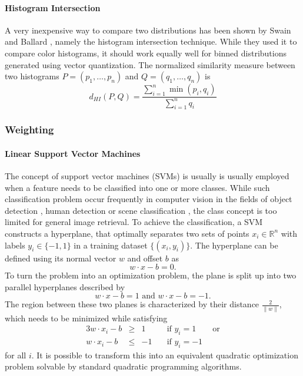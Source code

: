 \paragraph{Histogram Intersection}

A very inexpensive way to compare two distributions has been shown by Swain and
Ballard \autocite{swain_color_1991}, namely the histogram intersection
technique. While they used it to compare color histograms, it should work
equally well for binned distributions generated using vector quantization. The
normalized similarity measure between two histograms $P = (p_1, \dots, p_n)$
and $Q = (q_1, \dots, q_n)$ is
\begin{equation*}
    d_{HI}(P, Q) = \frac{\sum_{i=1}^n \min (p_i, q_i)}{\sum_{i=1}^n q_i}
\end{equation*}

\subsubsection{Weighting}

\paragraph{Linear Support Vector Machines}

The concept of support vector machines (SVMs) is usually is usually employed
when a feature needs to be classified into one or more classes. While such
classification problem occur frequently in computer vision in the fields of
object detection \autocite{pontil_support_1998} \autocite{csurka_visual_2004},
human detection \autocite{dalal_histograms_2005} or scene classification
\autocite{yang_evaluating_2007}, the class concept is too limited for general
image retrieval. To achieve the classification, a SVM constructs a hyperplane,
that optimally separates two sets of points $x_i \in \mathbb{R}^n$ with labels
$y_i \in \{-1, 1 \}$ in a training dataset $\{ (x_i, y_i) \}$. The hyperplane
can be defined using its normal vector $w$ and offset $b$ as
\begin{equation*}
    w \cdot x - b = 0.
\end{equation*}
To turn the problem into an optimization problem, the plane is split up into
two parallel hyperplanes described by
\begin{equation*}
    w \cdot x - b = 1 \text{ and } w \cdot x - b = -1.
\end{equation*}
The region between these two planes is characterized by their distance
$\frac{2}{\| w \|}$, which needs to be minimized while satisfying
\begin{alignat*}{3}
    w \cdot x_i - b & \geq & 1 & \quad \text{if } y_i = 1 \qquad \text{or} \\
    w \cdot x_i - b & \leq & -1 & \quad \text{if } y_i = -1
\end{alignat*}
for all $i$. It is possible to transform this into an equivalent quadratic
optimization problem solvable by standard quadratic programming algorithms.

